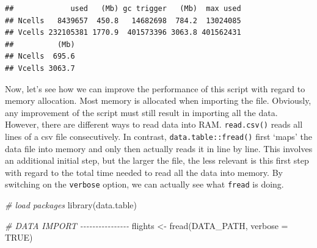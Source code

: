 \documentclass[
  12pt,
]{style/krantz}
\newenvironment{Shaded}{\begin{snugshade}}{\end{snugshade}}
\newcommand{\AttributeTok}[1]{\textcolor[rgb]{0.77,0.63,0.00}{#1}}
\newcommand{\CommentTok}[1]{\textcolor[rgb]{0.56,0.35,0.01}{\textit{#1}}}
\newcommand{\ConstantTok}[1]{\textcolor[rgb]{0.00,0.00,0.00}{#1}}
\newcommand{\FunctionTok}[1]{\textcolor[rgb]{0.00,0.00,0.00}{#1}}
\newcommand{\NormalTok}[1]{#1}
\newcommand{\OtherTok}[1]{\textcolor[rgb]{0.56,0.35,0.01}{#1}}
\begin{document}
\begin{verbatim}
##             used   (Mb) gc trigger   (Mb)  max used
## Ncells   8439657  450.8   14682698  784.2  13024085
## Vcells 232105381 1770.9  401573396 3063.8 401562431
##          (Mb)
## Ncells  695.6
## Vcells 3063.7
\end{verbatim}

Now, let's see how we can improve the performance of this script with regard to memory allocation. Most memory is allocated when importing the file. Obviously, any improvement of the script must still result in importing all the data. However, there are different ways to read data into RAM. \texttt{read.csv()} reads all lines of a csv file consecutively. In contrast, \texttt{data.table::fread()} first `maps' the data file into memory and only then actually reads it in line by line. This involves an additional initial step, but the larger the file, the less relevant is this first step with regard to the total time needed to read all the data into memory. By switching on the \texttt{verbose} option, we can actually see what \texttt{fread} is doing.

\begin{Shaded}
\begin{Highlighting}[]
\CommentTok{\# load packages}
\FunctionTok{library}\NormalTok{(data.table)}

\CommentTok{\# DATA IMPORT {-}{-}{-}{-}{-}{-}{-}{-}{-}{-}{-}{-}{-}{-}{-}{-}}
\NormalTok{flights }\OtherTok{\textless{}{-}} \FunctionTok{fread}\NormalTok{(DATA\_PATH, }\AttributeTok{verbose =} \ConstantTok{TRUE}\NormalTok{)}
\end{Highlighting}
\end{Shaded}
\end{document}
